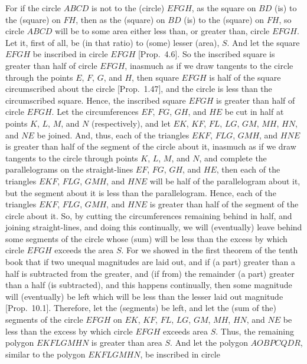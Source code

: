 \begin{Parallel}{}{}
{\epsfysize=3in
\centerline{}

For if the circle $ABCD$ is not to the (circle) $EFGH$, as the square on
$BD$ (is) to the (square) on $FH$, then  as the (square) on $BD$ (is) to
the (square) on $FH$, so circle $ABCD$ will be to some area either less than, or greater
than, circle $EFGH$. Let it, first of all, be (in that ratio) to (some) lesser (area), $S$.
And let the square $EFGH$ be inscribed in circle $EFGH$ [Prop.~4.6]. So the inscribed
square is greater than half of circle $EFGH$, inasmuch as if we draw tangents to the circle through the points $E$, $F$, $G$, and $H$,
then square $EFGH$ is half of the square circumscribed about the circle [Prop.~1.47], and the circle is less than the
circumscribed square. Hence, the inscribed square $EFGH$ is greater than
half of circle $EFGH$. Let the circumferences $EF$, $FG$, $GH$,
and $HE$ be cut in half at points $K$, $L$, $M$, and $N$ (respectively), and let $EK$, $KF$, $FL$, $LG$, $GM$, $MH$, $HN$,
and $NE$ be joined. And, thus, each of the triangles
$EKF$, $FLG$, $GMH$, and $HNE$ is greater than half of the
segment of the circle about it, inasmuch as if we draw tangents to the circle through points $K$, $L$, $M$, and $N$, and complete the parallelograms on the straight-lines $EF$, $FG$, $GH$, and $HE$, then
each of the triangles $EKF$, $FLG$, $GMH$, and $HNE$ will be
half of the parallelogram about it, but the segment about
it is less than the parallelogram. Hence, each of the triangles $EKF$, 
$FLG$, $GMH$, and $HNE$ is greater than half of the segment of
the circle about it. So, by cutting the  circumferences remaining behind in half,
and joining straight-lines, and doing this continually, we will
(eventually) leave behind some segments of the circle whose (sum) will be
less than the excess by which circle $EFGH$ exceeds the area $S$.
For we showed in the first theorem of the tenth book that if two unequal
magnitudes are laid out, and if (a part) greater than a half is subtracted
from the greater, and (if from) the remainder (a part) greater than a
half (is subtracted), and this happens continually, then some magnitude
will (eventually) be left which will be less than the lesser laid out magnitude [Prop.~10.1]. Therefore, let the (segments) be left, and let 
 the (sum of the) segments of the circle $EFGH$ on $EK$, $KF$, $FL$, $LG$, $GM$, $MH$, $HN$, and $NE$ be less than the excess by which  circle
 $EFGH$ exceeds  area $S$. Thus, the remaining polygon $EKFLGMHN$ is greater than area $S$. 
 And let the polygon $AOBPCQDR$,
 similar to the polygon $EKFLGMHN$, be inscribed in circle
}
\end{Parallel}
